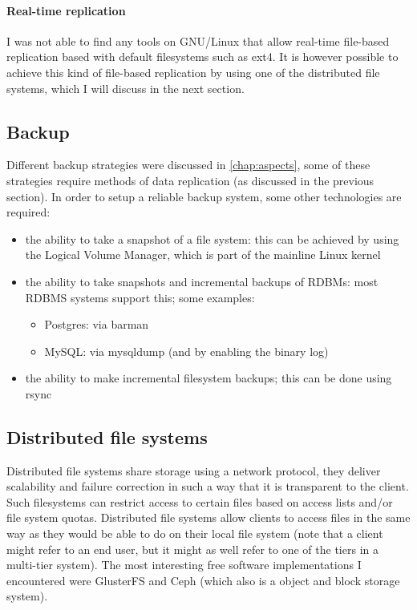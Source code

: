 \documentclass[12pt]{report}
\begin{document}
\paragraph*{Real-time replication}
I was not able to find any tools on GNU/Linux that allow real-time
file-based replication based with default filesystems such as ext4.
It is however possible to achieve this kind of file-based replication
by using one of the distributed file systems, which I will discuss in
the next section.

\subsection{Backup}
Different backup strategies were discussed in 
\cref{chap:aspects}, some of these strategies require methods of data
replication (as discussed in the previous section).
In order to setup a reliable backup system, some other technologies
are required: 
\begin{itemize}
\item the ability to take a snapshot of a file system: this can be
  achieved by using the Logical Volume Manager, which is part of the
  mainline Linux kernel \cite{linux_kernel_soft:2013}
\item the ability to take snapshots and incremental backups of RDBMs: most RDBMS systems
  support this; some examples:
  \begin{itemize}
  \item Postgres: via barman \cite{barman_software:2013}
  \item MySQL: via mysqldump (and by enabling the binary log)
  \end{itemize}
\item the ability to make incremental filesystem backups; this can be
  done using rsync \cite{rsync_software:2013}
\end{itemize}
\subsection{Distributed file systems}
\label{ceph}
Distributed file systems share storage using a network protocol, they
deliver scalability and failure
correction in such a way that it is transparent to the client.
Such filesystems can restrict access to certain files based on access lists
and/or file system quotas. Distributed file systems allow clients to
access files in the same way as they would be able to do on their
local file system (note that a client might refer to an end user, 
but it might as well refer to one of the tiers in a multi-tier
system).
The most interesting free software implementations I encountered were
GlusterFS \cite{glusterfs_soft:2013} and Ceph \cite{ceph_soft:2013}
(which also is a object and block storage system).
\end{document}
